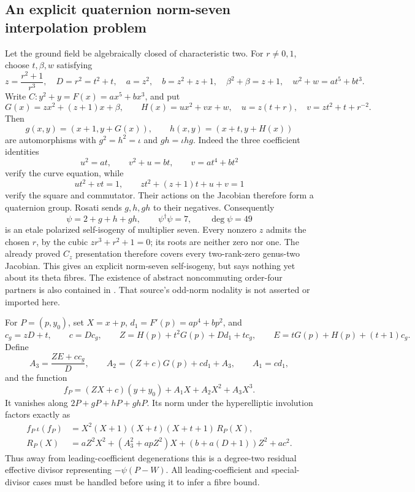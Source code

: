 \subsection{An explicit quaternion norm-seven interpolation problem}

Let the ground field be algebraically closed of characteristic two.
For $r\ne0,1$, choose $t,\beta,w$ satisfying
\[
 z=\frac{r^2+1}{r^3},\quad D=r^2=t^2+t,\quad
 a=z^2,\quad b=z^2+z+1,\quad
 \beta^2+\beta=z+1,\quad w^2+w=at^5+bt^3.
\]
Write $C:y^2+y=F(x)=ax^5+bx^3$, and put
\[
 G(x)=zx^2+(z+1)x+\beta,\qquad
 H(x)=ux^2+vx+w,
 \quad u=z(t+r),\quad v=zt^2+t+r^{-2}.
\]
Then
\[
 g(x,y)=(x+1,y+G(x)),\qquad
 h(x,y)=(x+t,y+H(x))
\]
are automorphisms with $g^2=h^2=\iota$ and $gh=\iota hg$.
Indeed the three coefficient identities
\[
 u^2=at,\qquad v^2+u=bt,\qquad v=at^4+bt^2
\]
verify the curve equation, while
\[
 ut^2+vt=1,\qquad zt^2+(z+1)t+u+v=1
\]
verify the square and commutator. Their actions on the Jacobian
therefore form a quaternion group. Rosati sends $g,h,gh$ to their
negatives. Consequently
\[
 \psi=2+g+h+gh,\qquad \psi^\dagger\psi=7,
 \qquad\deg\psi=49
\]
is an etale polarized self-isogeny of multiplier seven.
Every nonzero $z$ admits the chosen $r$, by the cubic
$zr^3+r^2+1=0$; its roots are neither zero nor one.
The already proved $C_z$ presentation therefore covers every
two-rank-zero genus-two Jacobian. This gives an explicit norm-seven
self-isogeny, but says nothing yet about its theta fibres.
The existence of abstract noncommuting order-four partners is also
contained in \citep[Lemma~2.1 and proof, printed pp.~4--8]{BrockHowe2025Richelot}. That source's odd-norm nodality
is not asserted or imported here.

For $P=(p,y_0)$, set $X=x+p$, $d_1=F'(p)=ap^4+bp^2$, and
\[
 c_g=zD+t,\qquad c=Dc_g,
 \qquad Z=H(p)+t^2G(p)+Dd_1+tc_g,
 \qquad E=tG(p)+H(p)+(t+1)c_g.
\]
Define
\[
 A_3=\frac{ZE+cc_g}{D},\qquad
 A_2=(Z+c)G(p)+cd_1+A_3,\qquad A_1=cd_1,
\]
and the function
\[
 f_P=(ZX+c)(y+y_0)+A_1X+A_2X^2+A_3X^3.
\]
It vanishes along $2P+gP+hP+ghP$. Its norm under the
hyperelliptic involution factors exactly as
\begin{align*}
 f_P\,\iota(f_P)
 &=X^2(X+1)(X+t)(X+t+1)\,R_P(X),\\
 R_P(X)
 &=aZ^2X^2+(A_3^2+apZ^2)X
       +(b+a(D+1))Z^2+ac^2.
\end{align*}
Thus away from leading-coefficient degenerations this is a
degree-two residual effective divisor representing $-\psi(P-W)$.
All leading-coefficient and special-divisor cases must be handled
before using it to infer a fibre bound.


